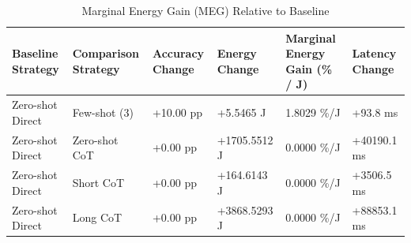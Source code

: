 \begin{table}
\caption{Marginal Energy Gain (MEG) Relative to Baseline}
\label{tab:marginal_energy_gain}
\begin{tabular}{llllll}
\toprule
Baseline Strategy & Comparison Strategy & Accuracy Change & Energy Change & Marginal Energy Gain (\% / J) & Latency Change \\
\midrule
Zero-shot Direct & Few-shot (3) & +10.00 pp & +5.5465 J & 1.8029 \%/J & +93.8 ms \\
Zero-shot Direct & Zero-shot CoT & +0.00 pp & +1705.5512 J & 0.0000 \%/J & +40190.1 ms \\
Zero-shot Direct & Short CoT & +0.00 pp & +164.6143 J & 0.0000 \%/J & +3506.5 ms \\
Zero-shot Direct & Long CoT & +0.00 pp & +3868.5293 J & 0.0000 \%/J & +88853.1 ms \\
\bottomrule
\end{tabular}
\end{table}
